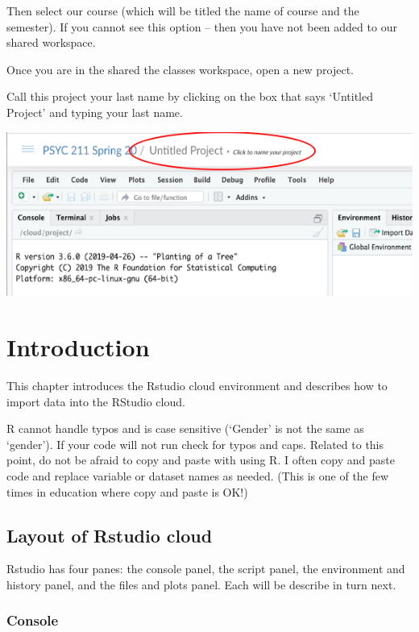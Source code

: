 \documentclass[
]{book}
\begin{document}
Then select our course (which will be titled the name of course and the semester). If you cannot see this option -- then you have not been added to our shared workspace.

Once you are in the shared the classes workspace, open a new project.

Call this project your last name by clicking on the box that says `Untitled Project' and typing your last name.

\includegraphics{img/Projname.png}

\hypertarget{introduction}{%
\chapter{Introduction}\label{introduction}}

This chapter introduces the Rstudio cloud environment and describes how to import data into the RStudio cloud.

R cannot handle typos and is case sensitive (`Gender' is not the same as `gender'). If your code will not run check for typos and caps. Related to this point, do not be afraid to copy and paste with using R. I often copy and paste code and replace variable or dataset names as needed. (This is one of the few times in education where copy and paste is OK!)

\hypertarget{layout-of-rstudio-cloud}{%
\section{Layout of Rstudio cloud}\label{layout-of-rstudio-cloud}}

Rstudio has four panes: the console panel, the script panel, the environment and history panel, and the files and plots panel. Each will be describe in turn next.

\hypertarget{console}{%
\subsection{Console}\label{console}}
\end{document}
